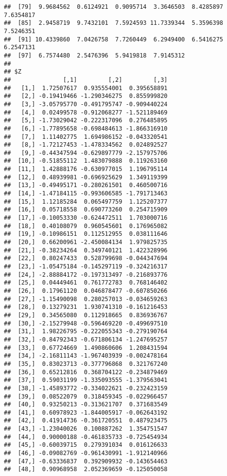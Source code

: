\documentclass[
]{article}
\begin{document}
\begin{verbatim}
##  [79]  9.9684562  0.6124921  0.9095714  3.3646503  8.4285897  7.6354817
##  [85]  2.9458719  9.7432101  7.5924593 11.7339344  5.3596398  7.5246351
##  [91] 10.4339860  7.0426758  7.7260449  6.2949400  6.5416275  6.2547131
##  [97]  6.7574480  2.5476396  5.9419818  7.9145312
## 
## $Z
##               [,1]         [,2]         [,3]
##   [1,]  1.72507617  0.935554001  0.395658891
##   [2,] -0.19419466 -1.290346275  0.855999820
##   [3,] -3.05795770 -0.491795747 -0.909440224
##   [4,]  0.02499578 -0.912068277 -1.521189469
##   [5,] -1.73029042 -0.222317096  0.276485895
##   [6,] -1.77895658 -0.698484613 -1.866316910
##   [7,]  1.11402775  1.694986152 -0.043320541
##   [8,] -1.72127453 -1.478334562  0.024892527
##   [9,] -0.44347594 -0.629897779 -2.157975706
##  [10,] -0.51855112  1.483079888  0.119263160
##  [11,]  1.42888176 -0.630977015  1.196795114
##  [12,]  0.48939981 -0.696925629  1.349119399
##  [13,] -0.49495171 -0.280261501  0.460500716
##  [14,] -1.47184115 -0.993606585 -1.791713463
##  [15,]  1.12185284  0.065497759  1.125207377
##  [16,]  0.05718558  0.690773260  0.254715909
##  [17,] -0.10053330 -0.624472511  1.703000716
##  [18,]  0.40108079  0.960545601  0.176965082
##  [19,] -0.10986151  0.112512955  0.038111646
##  [20,]  0.66200961 -2.450084134  1.979825735
##  [21,] -0.38234264  0.349740121  1.422328996
##  [22,]  0.80247433  0.528799698 -0.044347694
##  [23,] -1.05475184 -0.145297119 -0.324216317
##  [24,] -2.88884172 -0.197313497 -0.216893776
##  [25,]  0.04449461  0.761772783  0.768146402
##  [26,]  0.17961120  0.046878477 -0.607850266
##  [27,] -1.15490098  0.280257013 -0.034659263
##  [28,]  0.13279231  1.930741310 -0.161216453
##  [29,]  0.34565080  0.112918665  0.836936767
##  [30,] -2.15279948 -0.596469220 -0.499697510
##  [31,]  1.98226795 -0.222055343 -0.279190764
##  [32,] -0.84792343 -0.671806134 -1.247695257
##  [33,]  0.67724669  1.490860606  1.208431594
##  [34,] -2.16811143 -1.967403939 -0.002478164
##  [35,]  0.83023713 -0.377796868  0.321767240
##  [36,]  0.65212816  0.368704122 -0.234879469
##  [37,]  0.59031199 -1.335093555 -1.379563041
##  [38,] -1.45893772 -0.334022621 -0.232423159
##  [39,]  0.08522079  0.318459345 -0.022966457
##  [40,]  0.93250213 -0.313621707  0.371683549
##  [41,]  0.60978923 -1.844005917 -0.062643192
##  [42,]  0.41914736 -0.361720551  0.487923475
##  [43,] -1.23040026  0.100887262  1.354751547
##  [44,]  0.90000188 -0.461835733 -0.725454934
##  [45,] -0.60039715  0.279391034  0.016126633
##  [46,] -0.09082769 -0.961430991 -1.912140966
##  [47,] -0.63336837  0.392909932 -0.143654463
##  [48,]  0.90968958  2.052369659 -0.125050058

\end{verbatim}
\end{document}
